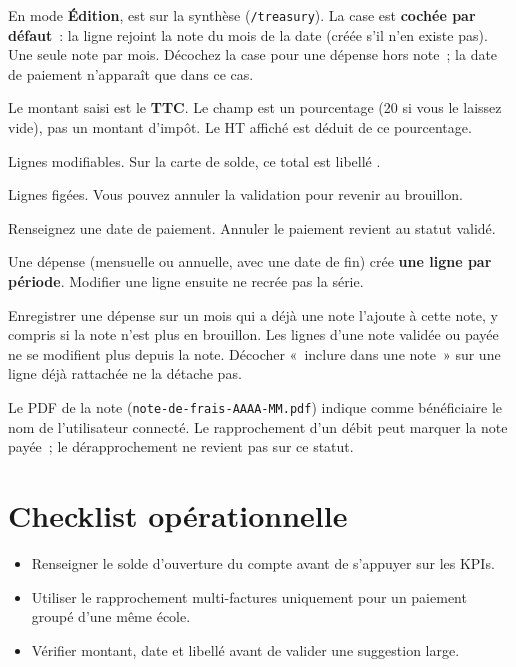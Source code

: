 En mode \textbf{Édition},  est sur la synthèse (\texttt{/treasury}). La case  est \textbf{cochée par défaut}~: la ligne rejoint la note du mois de la date (créée s'il n'en existe pas). Une seule note par mois. Décochez la case pour une dépense hors note~; la date de paiement n'apparaît que dans ce cas.

Le montant saisi est le \textbf{TTC}. Le champ  est un pourcentage (20 si vous le laissez vide), pas un montant d'impôt. Le HT affiché est déduit de ce pourcentage.

\begin{description}[style=nextline, leftmargin=2.5cm]
  \item[Brouillon] Lignes modifiables. Sur la carte de solde, ce total est libellé .
  \item[Validée] Lignes figées. Vous pouvez annuler la validation pour revenir au brouillon.
  \item[Payée] Renseignez une date de paiement. Annuler le paiement revient au statut validé.
\end{description}

Une dépense  (mensuelle ou annuelle, avec une date de fin) crée \textbf{une ligne par période}. Modifier une ligne ensuite ne recrée pas la série.

\begin{avertissement}
  Enregistrer une dépense sur un mois qui a déjà une note l'ajoute à cette note, y compris si la note n'est plus en brouillon. Les lignes d'une note validée ou payée ne se modifient plus depuis la note. Décocher «~inclure dans une note~» sur une ligne déjà rattachée ne la détache pas.
\end{avertissement}

Le PDF de la note (\texttt{note-de-frais-AAAA-MM.pdf}) indique comme bénéficiaire le nom de l'utilisateur connecté. Le rapprochement d'un débit peut marquer la note payée~; le dérapprochement ne revient pas sur ce statut.

\section{Checklist opérationnelle}

\begin{itemize}[leftmargin=*]
  \item Renseigner le solde d'ouverture du compte avant de s'appuyer sur les KPIs.
  \item Utiliser le rapprochement multi-factures uniquement pour un paiement groupé d'une même école.
  \item Vérifier montant, date et libellé avant de valider une suggestion large.
\end{itemize}


